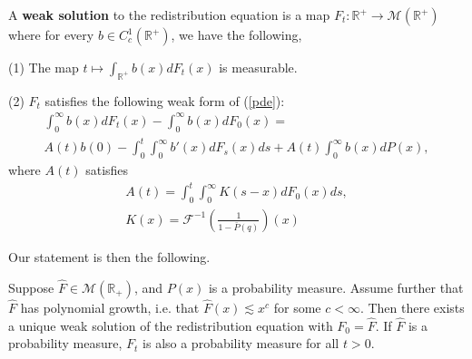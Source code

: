 \begin{deef}

   A \textbf{weak solution} to the redistribution equation is a map $F_t: \mathbb R^+ \rightarrow \mathcal M(\mathbb R^+)$ where for every $b \in C_c^1(\mathbb{R}^+)$, we  have the following, 

(1)  The map $ t \mapsto \int_{\mathbb R^+}b(x)dF_t(x)$ is measurable. 

(2) $F_t$ satisfies the following weak form of (\ref{pde}):
\begin{eqnarray}\label{weakform}
\int_0^\infty b(x)dF_{t}(x) - \int_0^\infty b(x)dF_0(x) = \\ A(t)b(0)-\int_0^t \int_0^\infty b'(x)dF_s(x) ds+A(t)\int_0^\infty b(x)dP(x), \nonumber
\end{eqnarray}
where $A(t)$ satisfies
\begin{eqnarray}
A(t) = \int_0^t\int_0^\infty  K(s-x)dF_0(x)ds,\\
K(x) = \mathcal F^{-1}(\frac 1{1-\bar P(q)})(x) \nonumber
\end{eqnarray}
 \end{deef}

Our statement is then the  following. 
\begin{theorem}\label{weak}  Suppose $\hat F \in \mathcal M(\mathbb R_+)$, and $P(x)$ is a probability measure.  Assume further that $\hat F$ has polynomial growth, i.e. that $\hat F(x) \lesssim x^c$ for some $c <\infty$.   Then there exists a unique weak solution of the redistribution equation with $F_0 = \hat F$. If $\hat F$ is a probability measure, $F_t$ is also a probability measure for all $t> 0$. \end{theorem}

